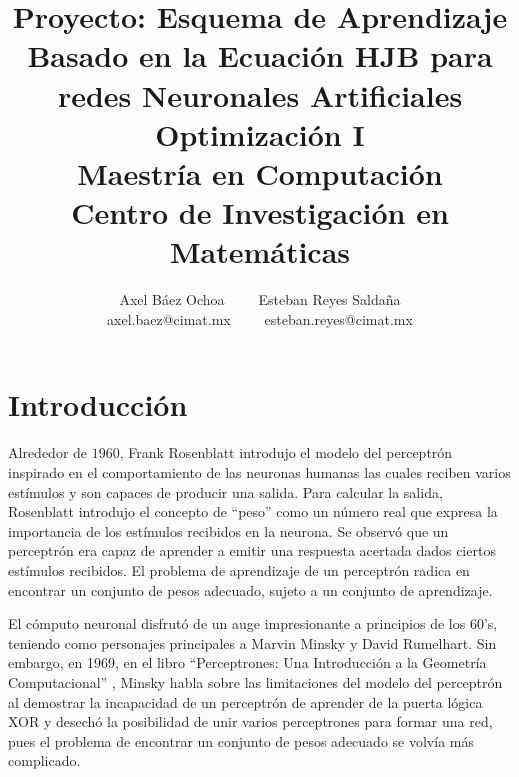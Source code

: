 \documentclass[11pt,letterpaper]{article}
\title{\textbf{Proyecto: Esquema de Aprendizaje Basado en la Ecuación HJB para redes Neuronales Artificiales}\\ Optimización I \\ \Large {Maestría en Computación}\\ \Large {Centro de Investigación en Matemáticas}}
\author{Axel Báez Ochoa  \textcolor{white}{text} Esteban Reyes Saldaña \\ axel.baez@cimat.mx \textcolor{white}{text}  esteban.reyes@cimat.mx }
\theoremstyle{definition}
\theoremstyle{definition}
\theoremstyle{definition}
\theoremstyle{definition}
\theoremstyle{definition}
\theoremstyle{definition}
\theoremstyle{definition}
\theoremstyle{definition}
\begin{document}

\section{Introducción}
\noindent
Alrededor de $ 1960 $, Frank Rosenblatt \cite{10} introdujo el modelo del perceptrón inspirado en el comportamiento de las neuronas humanas las cuales reciben varios estímulos y son capaces de producir una salida. Para calcular la salida, Rosenblatt introdujo el concepto de ``peso'' como un número real que expresa la importancia de los estímulos recibidos en la neurona. Se observó que un perceptrón era capaz de aprender a emitir una respuesta acertada dados ciertos estímulos recibidos. El problema de aprendizaje de un perceptrón radica en encontrar un conjunto de pesos adecuado, sujeto a un conjunto de aprendizaje.

El cómputo neuronal disfrutó de un auge impresionante a principios de los 60's, teniendo como personajes principales a Marvin Minsky y David Rumelhart. Sin embargo, en 1969, en el libro ``Perceptrones: Una Introducción a la Geometría Computacional'' \cite{4}, Minsky habla sobre las limitaciones del modelo del perceptrón al demostrar la incapacidad de un perceptrón de aprender de la puerta lógica XOR y desechó la posibilidad de unir varios perceptrones para formar una red, pues el problema de encontrar un conjunto de pesos adecuado se volvía más complicado. 
\end{document}
